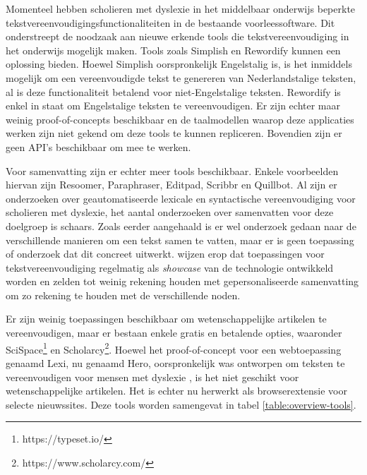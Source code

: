 \medspace

Momenteel hebben scholieren met dyslexie in het middelbaar onderwijs beperkte tekstvereenvoudigingsfunctionaliteiten in de bestaande voorleessoftware. Dit onderstreept de noodzaak aan nieuwe erkende tools die tekstvereenvoudiging in het onderwijs mogelijk maken. Tools zoals Simplish en Rewordify kunnen een oplossing bieden. Hoewel Simplish oorspronkelijk Engelstalig is, is het inmiddels mogelijk om een vereenvoudigde tekst te genereren van Nederlandstalige teksten, al is deze functionaliteit betalend voor niet-Engelstalige teksten. Rewordify is enkel in staat om Engelstalige teksten te vereenvoudigen. Er zijn echter maar weinig proof-of-concepts beschikbaar en de taalmodellen waarop deze applicaties werken zijn niet gekend om deze tools te kunnen repliceren. Bovendien zijn er geen API's beschikbaar om mee te werken. 

\medspace

Voor samenvatting zijn er echter meer tools beschikbaar. Enkele voorbeelden hiervan zijn Resoomer, Paraphraser, Editpad, Scribbr en Quillbot. Al zijn er onderzoeken over geautomatiseerde lexicale en syntactische vereenvoudiging voor scholieren met dyslexie, het aantal onderzoeken over samenvatten voor deze doelgroep is schaars. Zoals eerder aangehaald is er wel onderzoek gedaan naar de verschillende manieren om een tekst samen te vatten, maar er is geen toepassing of onderzoek dat dit concreet uitwerkt. \textcite{Sanja2021} wijzen erop dat toepassingen voor tekstvereenvoudiging regelmatig als \textit{showcase} van de technologie ontwikkeld worden en zelden tot weinig rekening houden met gepersonaliseerde samenvatting om zo rekening te houden met de verschillende noden.

\medspace

Er zijn weinig toepassingen beschikbaar om wetenschappelijke artikelen te vereenvoudigen, maar er bestaan enkele gratis en betalende opties, waaronder SciSpace\footnote{https://typeset.io/} en Scholarcy\footnote{https://www.scholarcy.com/}. Hoewel het proof-of-concept voor een webtoepassing genaamd Lexi, nu genaamd Hero, oorspronkelijk was ontworpen om teksten te vereenvoudigen voor mensen met dyslexie \autocite{Bingel2018}, is het niet geschikt voor wetenschappelijke artikelen. Het is echter nu herwerkt als browserextensie voor selecte nieuwssites. Deze tools worden samengevat in tabel \ref{table:overview-tools}.

